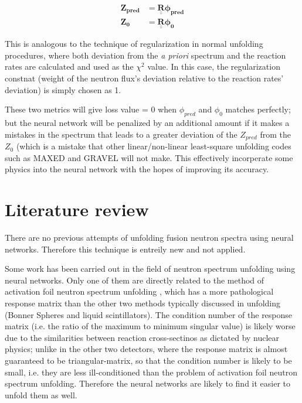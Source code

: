 \documentclass[a4paper, 12pt]{article}
\newcommand{\matr}[1]{\underline{\underline{\textbf{#1}}}}
\newcommand{\ve}[1]{\boldsymbol{#1}}
\begin{document}
    \begin{align}\label{unfolding general equation prediction}
        \ve{Z_{pred}} &= \matr{R} \ve{\phi_{pred} }\\
        \ve{Z_{0}} &= \matr{R} \ve{\phi_{0} }
    \end{align}

    This is analogous to the technique of regularization\cite{FisherRegularization} in normal unfolding procedures, where both deviation from the \emph{a priori} spectrum and the reaction rates are calculated and used as the $\chi^2$ value. In this case, the regularization constnat (weight of the neutron flux's deviation relative to the reaction rates' deviation) is simply chosen as 1.

    These two metrics will give loss value = 0 when $\phi_{pred}$ and $\phi_0$ matches perfectly; but the neural network will be penalized by an additional amount if it makes a mistakes in the spectrum that leads to a greater deviation of the $Z_{pred}$ from the $Z_{0}$ (which is a mistake that other linear/non-linear least-square unfolding codes such as MAXED and GRAVEL will not make. This effectively incorperate some physics into the neural network with the hopes of improving its accuracy.

\section{Literature review}
There are no previous attempts of unfolding fusion neutron spectra using neural networks. Therefore this technique is entreily new and not applied.

Some work has been carried out in the field of neutron spectrum unfolding using neural networks. Only one of them are directly related to the method of activation foil neutron spectrum unfolding \cite{Accelerator-basedANNUnfolding}, which has a more pathological response matrix than the other two methods typically discussed in unfolding (Bonner Spheres and liquid scintillators). The condition number of the response matrix (i.e. the ratio of the maximum to minimum singular value\cite{MATLAB}) is likely worse due to the similarities between reaction cross-sectinos as dictated by nuclear physics; unlike in the other two detectors, where the response matrix is almost guaranteed to be triangular-matrix, so that the condition number is likely to be small, i.e. they are less ill-conditioned than the problem of activation foil neutron spectrum unfolding. Therefore the neural networks are likely to find it easier to unfold them as well.
\end{document}
